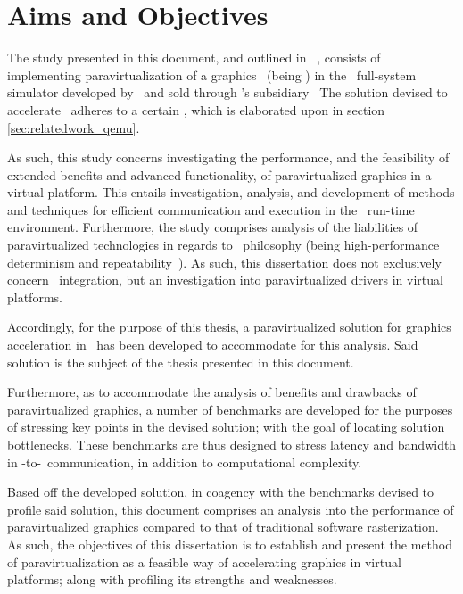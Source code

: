
\chapter{Aims and Objectives}
\label{cha:aimsandobjectives}
The study presented in this document, and outlined in ~, consists of implementing paravirtualization of a graphics \dvttermapi\ (being \dvttermopenglestwopointo ) in the \dvttermsimics\ full-system simulator developed by \dvttermintel\ and sold through \dvttermintel 's subsidiary \dvttermwindriver\ 
The solution devised to accelerate \dvttermopengl\ adheres to a certain \dvttermreferencesolution , which is elaborated upon in section \ref{sec:relatedwork_qemu}.

As such, this study concerns investigating the performance, and the feasibility of extended benefits and advanced functionality, of paravirtualized graphics in a virtual platform.
This entails investigation, analysis, and development of methods and techniques for efficient communication and execution in the \dvttermsimics\ run-time environment.
Furthermore, the study comprises analysis of the liabilities of paravirtualized technologies in regards to \dvttermsimics\ philosophy (being high-performance determinism and repeatability~).
As such, this dissertation does not exclusively concern \dvttermsimics\ integration, but an investigation into paravirtualized drivers in virtual platforms.

Accordingly, for the purpose of this thesis, a paravirtualized solution for graphics acceleration in \dvttermsimics\ has been developed to accommodate for this analysis.
Said solution is the subject of the thesis presented in this document.

Furthermore, as to accommodate the analysis of benefits and drawbacks of paravirtualized graphics, a number of benchmarks are developed for the purposes of stressing key points in the devised solution; with the goal of locating solution bottlenecks.
These benchmarks are thus designed to stress latency and bandwidth in \dvttermtarget -to-\dvttermhost\ communication, in addition to computational complexity.

Based off the developed solution, in coagency with the benchmarks devised to profile said solution, this document comprises an analysis into the performance of paravirtualized graphics compared to that of traditional software rasterization.
As such, the objectives of this dissertation is to establish and present the method of paravirtualization as a feasible way of accelerating graphics in virtual platforms; along with profiling its strengths and weaknesses.\\

